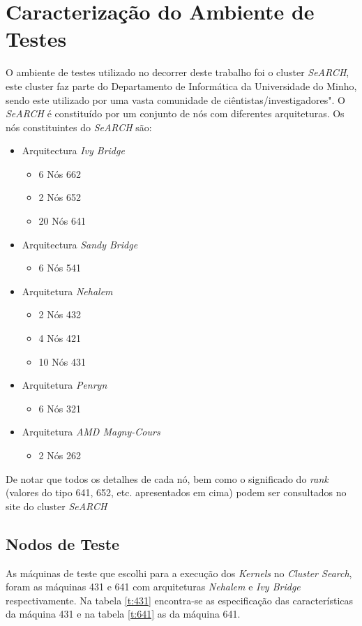 \documentclass[conference,compsoc]{IEEEtran}
\begin{document}
\section{Caracterização do Ambiente de Testes}
O ambiente de testes utilizado no decorrer deste trabalho foi o cluster \textit{SeARCH}, este cluster faz parte do Departamento de Informática da Universidade do Minho, sendo este utilizado por uma vasta comunidade de ciêntistas/investigadores". O \textit{SeARCH} é constituído por um conjunto de nós com diferentes arquiteturas. Os nós constituintes do \textit{SeARCH} são:
\begin{itemize}
\item Arquitectura \textit{Ivy Bridge}
\begin{itemize}
\item 6 Nós 662
\item 2 Nós 652
\item 20 Nós 641
\end{itemize}
\item Arquitectura \textit{Sandy Bridge}
\begin{itemize}
\item 6 Nós 541
\end{itemize}
\item Arquitetura \textit{Nehalem}
\begin{itemize}
\item 2 Nós 432
\item 4 Nós 421
\item 10 Nós 431
\end{itemize}
\item Arquitetura \textit{Penryn}
\begin{itemize}
\item 6 Nós 321
\end{itemize}
\item Arquitetura \textit{AMD Magny-Cours}
\begin{itemize}
\item 2 Nós 262
\end{itemize}
\end{itemize}
De notar que todos os detalhes de cada nó, bem como o significado do \textit{rank} (valores do tipo 641, 652, etc. apresentados em cima) podem ser consultados no site do cluster \textit{SeARCH}\cite{search}

\subsection{Nodos de Teste}
As máquinas de teste que escolhi para a execução dos \textit{Kernels} no \textit{Cluster Search}, foram as máquinas 431 e 641 com arquiteturas \textit{Nehalem} e \textit{Ivy Bridge} respectivamente. Na tabela \ref{t:431} encontra-se as especificação das características da máquina 431 e na tabela \ref{t:641} as da máquina 641.
\end{document}
